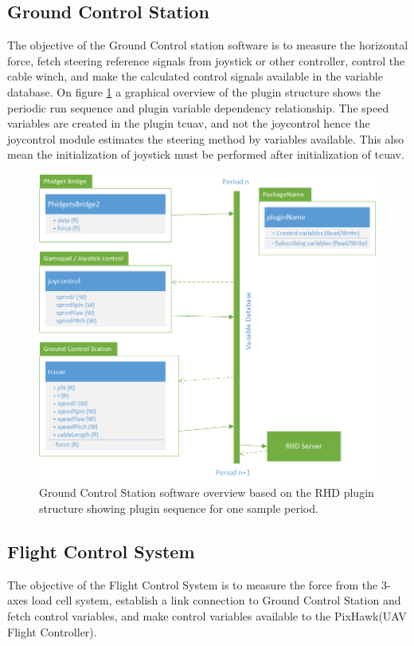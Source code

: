 \subsection{Ground Control Station}
The objective of the Ground Control station software is to measure the horizontal force, fetch steering reference signals from joystick or other controller, control the cable winch, and make the calculated control signals available in the variable database. On figure \ref{fig:GCS-software-overview} a graphical overview of the plugin structure shows the periodic run sequence and plugin variable dependency relationship. The speed variables are created in the plugin tcuav, and not the joycontrol hence the joycontrol module estimates the steering method by variables available. This also mean the initialization of joystick must be performed after initialization of tcuav. 
\begin{figure}[hbtp]
\centering
\includegraphics[scale=0.8]{graphics/Visio/GCS-software-overview.png}
\caption[Ground Control Station software overview]{Ground Control Station software overview based on the RHD plugin structure showing plugin sequence for one sample period.}
\label{fig:GCS-software-overview}
\end{figure}




\subsection{Flight Control System}
The objective of the Flight Control System is to measure the force from the 3-axes load cell system, establish a link connection to Ground Control Station and fetch control variables, and make control variables available to the PixHawk(UAV Flight Controller).


